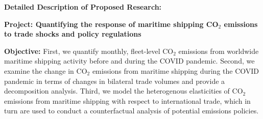\documentclass[hidelinks, 12pt,letterpaper]{article}
\begin{document}




\begin{center}
\textbf{Detailed Description of Proposed Research: }\vspace{-0.25cm}
\end{center}

\noindent \textbf{Project: Quantifying the response of maritime shipping CO$_2$ emissions to trade shocks and policy regulations}
\smallskip

\noindent \textbf{Objective:} First, we quantify monthly, fleet-level CO$_2$ emissions from worldwide maritime shipping activity before and during the COVID pandemic.
Second, we examine the change in CO$_2$ emissions from maritime shipping during the COVID pandemic in terms of changes in bilateral trade volumes and provide a decomposition analysis. 
Third, we model the heterogenous elasticities of CO$_2$ emissions from maritime shipping with respect to international trade, which in turn are used to conduct a counterfactual analysis of potential emissions policies.
\smallskip
\end{document}
